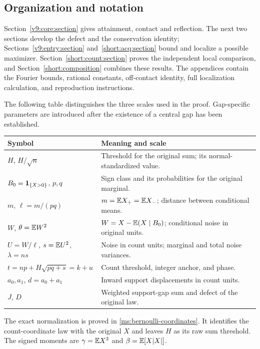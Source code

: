 \subsection{Organization and notation}\label{ms:guide}\label{ms:notation}
Section~\ref{v9:core:section} gives attainment, contact and reflection.
The next two sections develop the defect and the conservation identity;
Sections~\ref{v9:entry:section} and~\ref{short:acq:section} bound and
localize a possible maximizer. Section~\ref{short:count:section} proves
the independent local comparison, and Section~\ref{short:composition}
combines these results. The appendices contain the Fourier bounds,
rational constants, off-contact identity, full localization calculation,
and reproduction instructions.

The following table distinguishes the three scales used in the proof.
Gap-specific parameters are introduced after the existence of a central
gap has been established.
\begin{center}\small
\begin{tabular}{@{}P{.27\linewidth}P{.66\linewidth}@{}}
\toprule
Symbol & Meaning and scale \\
\midrule
$H$, $H/\sqrt n$ & Threshold for the original sum; its normal-standardized value. \\
$B_0=\mathbf 1_{\{X>0\}}$, $p,q$ & Sign class and its probabilities for the original marginal. \\
$m$, $\ell=m/(pq)$ & $m=\mathbb E X_+=\mathbb E X_-$; distance between conditional means. \\
$W$, $\theta=\mathbb E W^2$ & $W=X-\mathbb E(X\mid B_0)$; conditional noise in original units. \\
$U=W/\ell$, $s=\mathbb E U^2$, $\lambda=ns$ & Noise in count units; marginal and total noise variances. \\
$t=np+H\sqrt{pq+s}=k+u$ & Count threshold, integer anchor, and phase. \\
$a_0,a_1$, $d=a_0+a_1$ & Inward support displacements in count units. \\
$J$, $D$ & Weighted support-gap sum and defect of the original law. \\
\bottomrule
\end{tabular}
\end{center}
The exact normalization is proved in \eqref{ms:bernoulli-coordinates}.
It identifies the count-coordinate law with the original $X$ and leaves
$H$ as its raw sum threshold. The signed moments are
$\gamma=\mathbb E X^3$ and $\beta=\mathbb E[X|X|]$.
